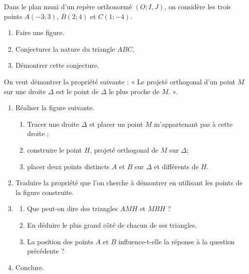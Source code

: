 \documentclass[11pt]{article}
\begin{document}
\begin{exo}
Dans le plan muni d'un repère orthonormé $(O; I, J)$, on
considère les trois points $A(-3; 3)$, $B(2; 4)$ et $C(1; -4)$.
\begin{enumerate}
  \item Faire une figure.
  \item Conjecturer la nature du triangle $ABC$.
  \item Démontrer cette conjecture.
\end{enumerate}
\end{exo}

\begin{exo}
On veut démontrer la propriété suivante : « Le projeté
orthogonal d'un point $M$ sur une droite $\Delta$ est le point de $\Delta$ le
plus proche de $M$. ».
\begin{enumerate}
  \item Réaliser la figure suivante.
    \begin{enumerate}
      \item Tracer une droite $\Delta$ et placer un point $M$ m'appartenant pas
        à cette droite ;
      \item construire le point $H$, projeté orthogonal de $M$ sur $\Delta$;
      \item placer deux points distincts $A$ et $B$ sur $\Delta$ et différents
        de $H$.
    \end{enumerate}
  \item Traduire la propriété que l'on cherche à démontrer en utilisant les
    points de la figure construite.
    \item \begin{enumerate}
        \item Que peut-on dire des triangles $AMH$ et $MBH$ ?
        \item En déduire le plus grand côté de chacun de ses triangles.
        \item La position des points $A$ et $B$ influence-t-elle la réponse à la
          question précédente ?
      \end{enumerate}
    \item Conclure.
\end{enumerate}
\end{exo}
\end{document}
